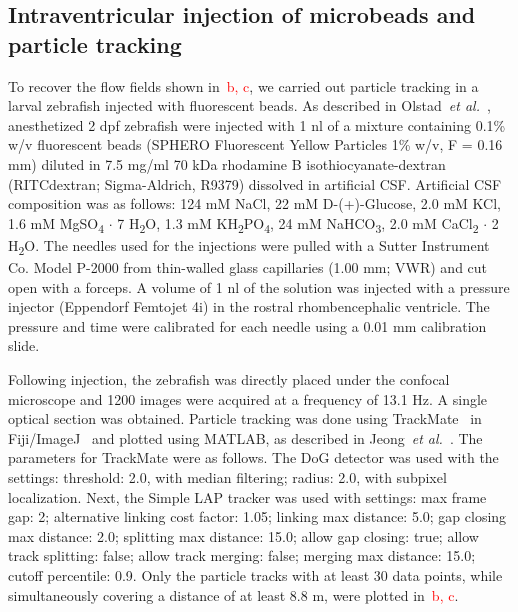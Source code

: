 \documentclass[fleqn]{wlscirep}
\newcommand{\fixme}[1]{\textcolor{red}{#1}}
\begin{document}
\subsection*{Intraventricular injection of microbeads and particle tracking}
To recover the flow fields shown in~\fixme{b, c}, we carried out
particle tracking in a larval zebrafish injected with fluorescent beads.
As described in Olstad~\emph{et al.}~\cite{Olstad2019CiliaryDevelopment},
anesthetized 2 dpf zebrafish were injected with 1 nl of a mixture containing 0.1\% w/v fluorescent beads
(SPHERO Fluorescent Yellow Particles 1\% w/v, F = 0.16 mm) diluted
in 7.5 mg/ml 70 kDa rhodamine B isothiocyanate-dextran (RITCdextran; Sigma-Aldrich, R9379)
dissolved in artificial CSF. Artificial CSF composition was as follows:
124 mM NaCl, 22 mM D-(+)-Glucose, 2.0 mM KCl, 1.6 mM MgSO\textsubscript{4} $\cdot$ 7 H\textsubscript{2}O,
1.3 mM KH\textsubscript{2}PO\textsubscript{4}, 24 mM NaHCO\textsubscript{3},
2.0 mM CaCl\textsubscript{2} $\cdot$ 2 H\textsubscript{2}O.
The needles used for the injections were pulled with a
Sutter Instrument Co. Model P-2000 from thin-walled glass
capillaries (1.00 mm; VWR) and cut open with a forceps.
A volume of 1 nl of the solution was injected with a pressure injector
(Eppendorf Femtojet 4i) in the rostral rhombencephalic ventricle.
The pressure and time were calibrated for each needle using a 0.01 mm calibration slide.

Following injection, the zebrafish was directly placed under the confocal
microscope and 1200 images were acquired at a frequency of 13.1 Hz.
A single optical section was obtained. Particle tracking was done using
TrackMate~\cite{Tinevez2017TrackMate:Tracking} in Fiji/ImageJ~\cite{Schindelin2012Fiji:Analysis}
and plotted using MATLAB, as described in Jeong~\emph{et al.}~\cite{Jeong2022MeasurementTelencephalon}.
The parameters for TrackMate were as follows.
The DoG detector was used with the settings: threshold: 2.0, with
median filtering; radius: 2.0, with subpixel localization.
Next, the Simple LAP tracker was used with settings: max frame gap: 2;
alternative linking cost factor: 1.05; linking max distance: 5.0; gap closing max distance: 2.0;
splitting max distance: 15.0; allow gap closing: true; allow track splitting:
false; allow track merging: false; merging max distance: 15.0; cutoff percentile: 0.9.
Only the particle tracks with at least 30 data points, while simultaneously
covering a distance of at least 8.8 \textmu m, were plotted in~\fixme{b, c}.
\end{document}
